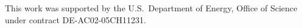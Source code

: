 \documentclass[letterpaper,11pt]{article}
\begin{document}
\acknowledgments

This work was supported by the U.S.~Department of Energy, Office of Science under contract DE-AC02-05CH11231. 

\vspace{10mm}




\end{document}
